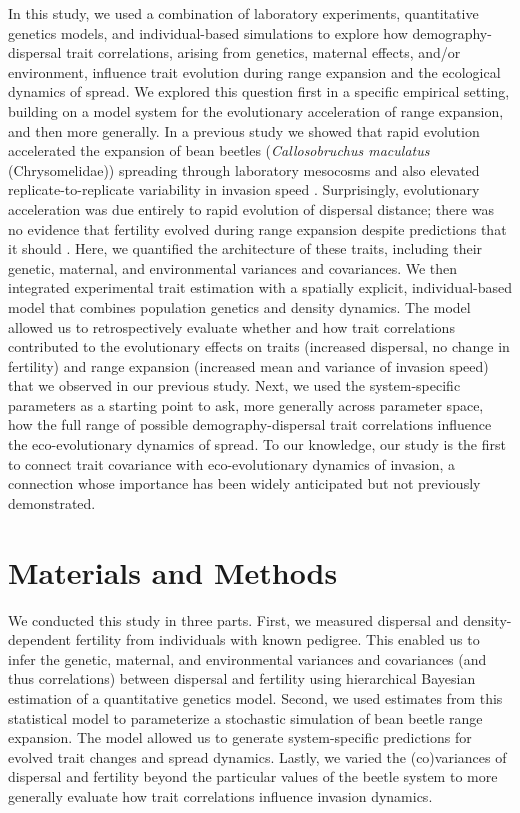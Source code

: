 \documentclass[11pt]{article}
\begin{document}
In this study, we used a combination of laboratory experiments, quantitative genetics models, and individual-based simulations to explore how demography-dispersal trait correlations, arising from genetics, maternal effects, and/or environment, influence trait evolution during range expansion and the ecological dynamics of spread.
We explored this question first in a specific empirical setting, building on a model system for the evolutionary acceleration of range expansion, and then more generally.
In a previous study we showed that rapid evolution accelerated the expansion of bean beetles (\textit{Callosobruchus maculatus} (Chrysomelidae)) spreading through laboratory mesocosms and also elevated replicate-to-replicate variability in invasion speed \citep{ochocki_rapid_2017}.
Surprisingly, evolutionary acceleration was due entirely to rapid evolution of dispersal distance; there was no evidence that fertility evolved during range expansion despite predictions that it should \citep{ochocki_rapid_2017}.
Here, we quantified the architecture of these traits, including their genetic, maternal, and environmental variances and covariances.
We then integrated experimental trait estimation with a spatially explicit, individual-based model that combines population genetics and density dynamics.
The model allowed us to retrospectively evaluate whether and how trait correlations contributed to the evolutionary effects on traits (increased dispersal, no change in fertility) and range expansion (increased mean and variance of invasion speed) that we observed in our previous study.
Next, we used the system-specific parameters as a starting point to ask, more generally across parameter space, how the full range of possible demography-dispersal trait correlations influence the eco-evolutionary dynamics of spread.
To our knowledge, our study is the first to connect trait covariance with  eco-evolutionary dynamics of invasion, a connection whose importance has been widely anticipated \citep{chuang_expanding_2016,phillips_life-history_2010,perkins_evolution_2013} but not previously demonstrated.

\section*{Materials and Methods}

We conducted this study in three parts.
First, we measured dispersal and density-dependent fertility from individuals with known pedigree.
This enabled us to infer the genetic, maternal, and environmental variances and covariances (and thus correlations) between dispersal and fertility using hierarchical Bayesian estimation of a quantitative genetics model.
Second, we used estimates from this statistical model to parameterize a stochastic simulation of bean beetle range expansion.
The model allowed us to generate system-specific predictions for evolved trait changes and spread dynamics.
Lastly, we varied the (co)variances of dispersal and fertility beyond the particular values of the beetle system to more generally evaluate how trait correlations influence invasion dynamics.
\end{document}
